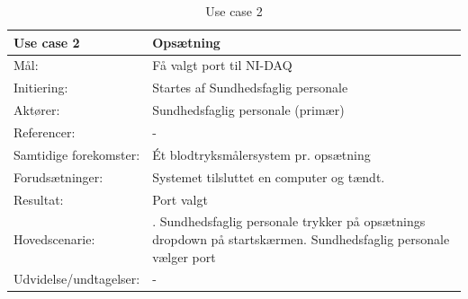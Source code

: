 \begin{table}[H]
\caption{Use case 2}\label{tab:tabel3}
\begin{tabular}{| l | >{\raggedright\arraybackslash}p{11cm} |}
   \hline
   \textbf{Use case 2} & \textbf{Opsætning}\\ \hline
   Mål: & Få valgt port til NI-DAQ \\ \hline
   Initiering: & Startes af Sundhedsfaglig personale\\ \hline
   Aktører:& Sundhedsfaglig personale (primær) \\ \hline
   Referencer: &  -\\ \hline
   Samtidige forekomster: & Ét blodtryksmålersystem pr. opsætning \\\hline
   Forudsætninger: & Systemet tilsluttet en computer og tændt. \\ \hline
   Resultat:& Port valgt\\ \hline
   Hovedscenarie:& 
1. Sundhedsfaglig personale trykker på opsætnings dropdown på startskærmen\newline
2. Sundhedsfaglig personale vælger port \\\hline
Udvidelse/undtagelser: & -\\\hline
\end{tabular}
\end{table}



